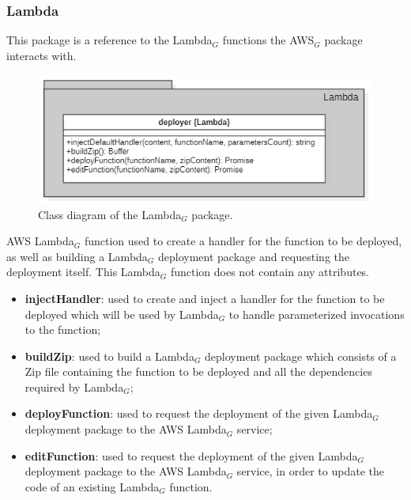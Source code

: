 	\subsubsection{Lambda}
	This package is a reference to the Lambda$_{G}$ functions the AWS$_{G}$ package interacts with.
	\begin{figure} [h!]
		\centering
		\includegraphics[width=0.7\linewidth]{diagrammi/etherless-server/Lambda}
		\caption{Class diagram of the Lambda$_{G}$ package.}
	\end{figure}
	AWS Lambda$_{G}$ function used to create a handler for the function to be deployed, as well as building a Lambda$_{G}$ deployment package and requesting the deployment itself.
	This Lambda$_{G}$ function does not contain any attributes.
	\begin{itemize}
		\item \textbf{injectHandler}: used to create and inject a handler for the function to be deployed which will be used by Lambda$_{G}$ to handle parameterized invocations to the function;
		\item \textbf{buildZip}: used to build a Lambda$_{G}$ deployment package which consists of a Zip file containing the function to be deployed and all the dependencies required by Lambda$_{G}$;
		\item \textbf{deployFunction}: used to request the deployment of the given Lambda$_{G}$ deployment package to the AWS Lambda$_{G}$ service;
		\item \textbf{editFunction}: used to request the deployment of the given Lambda$_{G}$ deployment package to the AWS Lambda$_{G}$ service, in order to update the code of an existing Lambda$_{G}$ function.
	\end{itemize}
